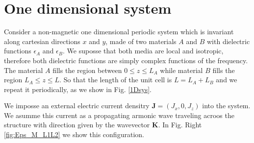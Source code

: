 \documentclass{iopart}
\begin{document}
\section{One dimensional system}
\label{Theory}

Consider a non-magnetic one dimensional periodic system which is
invariant along cartesian directions $x$ and $y$, made of two
materials $A$ and $B$ with dielectric functions $\epsilon_A$ and
$\epsilon_B$. We suposse that both media are local and isotropic,
therefore both dielectric functions are simply complex functions of
the frequency. The material $A$ fills the region between $0\le z \le
L_A$ while material $B$ fills the region $L_A\le z\le L$. So that the
length of the unit cell is $L=L_A+L_B$ and we repeat it periodically,
as we show in Fig. \ref{1Dsys}. 


We imposse an external electric current densitry
$\mathbf{J}=(J_x,0,J_z)$ into the system. We asumme this current as a
propagating armonic wave traveling acroos the structure with direction
given by the wavevector $\mathbf K$.  In Fig. Right \ref{fig:Eps_M_L1L2} we 
show this configuration.
\end{document}
